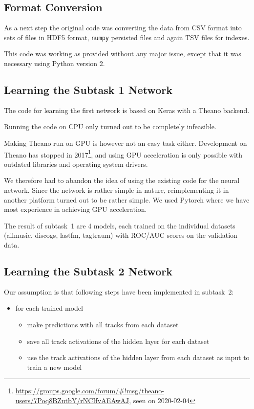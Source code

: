 \documentclass[sigconf,nonacm]{acmart}
\begin{document}
\subsection{Format Conversion}

As a next step the original code was converting the data from
CSV format into sets of files in HDF5 format, \texttt{numpy}
persisted files and again TSV files for indexes.

This code was working as provided without any major issue,
except that it was necessary using Python version 2.

\subsection{Learning the Subtask 1 Network}

The code for learning the first network is based on Keras
with a Theano backend.

Running the code on CPU only turned out to be completely infeasible.

Making Theano run on GPU is however not an easy task either.
Development on Theano has stopped in 
2017\footnote{\url{https://groups.google.com/forum/\#!msg/theano-users/7Poq8BZutbY/rNCIfvAEAwAJ}, seen on 2020-02-04},
and using GPU acceleration
is only possible with outdated libraries and operating system drivers.

We therefore had to abandon the idea of using the existing code
for the neural network.
Since the network is rather simple in nature, reimplementing
it in another platform turned out to be rather simple.
We used Pytorch where we have most experience
in achieving GPU acceleration.

The result of subtask~1 are 4 models, each trained on the individual
datasets (allmusic, discogs, lastfm, tagtraum) with ROC/AUC scores
on the validation data.

\subsection{Learning the Subtask 2 Network}

Our assumption is that following steps have been implemented in subtask~2:

\begin{itemize}
  \item for each trained model
  \begin{itemize}
    \item make predictions with all tracks from each dataset
    \item save all track activations of the hidden layer for each dataset
    \item use the track activations of the hidden layer from each dataset as input to train a new model
  \end{itemize}
\end{itemize}
\end{document}
